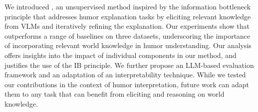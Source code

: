 We introduced \method{}, an unsupervised method inspired by the information bottleneck principle that addresses  humor explanation tasks by eliciting relevant knowledge from VLMs and iteratively refining the explanation. Our experiments show that \method{} outperforms a range of baselines on three datasets, underscoring the importance of incorporating relevant world knowledge in humor understanding. Our analysis offers insights into the impact of individual components in our method, and justifies the use of the IB principle. We further propose an LLM-based evaluation framework and an adaptation of an interpretability technique. While we tested our contributions in the context of humor interpretation, future work can adapt them to any task that can benefit from eliciting and reasoning on world knowledge. 
